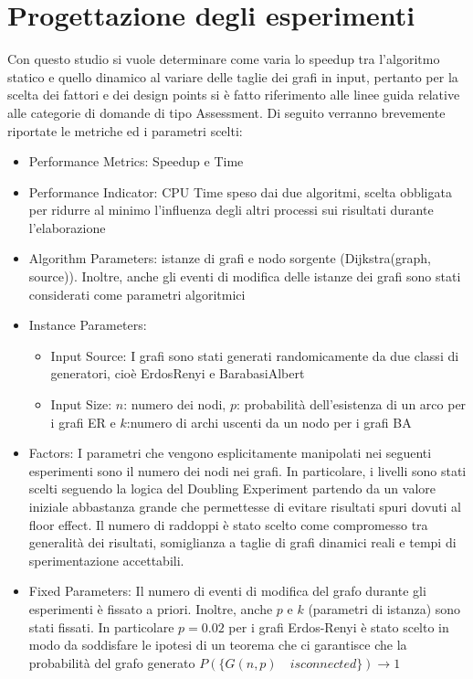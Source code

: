 \documentclass[a4paper]{article}
\begin{document}
\section{Progettazione degli esperimenti}
Con questo studio si vuole determinare come varia lo speedup tra l'algoritmo statico e quello dinamico al variare delle taglie dei grafi in input, pertanto per la scelta dei fattori e dei design points si è fatto riferimento alle linee guida relative alle categorie di domande di tipo Assessment.
Di seguito verranno brevemente riportate le metriche ed i parametri scelti:
\begin{itemize}
\item Performance Metrics: Speedup e Time
\item Performance Indicator: CPU Time speso dai due algoritmi, scelta obbligata per ridurre al minimo l'influenza degli altri processi sui risultati durante l'elaborazione
\item Algorithm Parameters: istanze di grafi e nodo sorgente (Dijkstra(graph, source)). Inoltre, anche gli eventi di modifica delle istanze dei grafi sono stati considerati come parametri algoritmici
\item Instance Parameters: 
\begin{itemize}
\item Input Source: I grafi sono stati generati randomicamente da due classi di generatori, cioè ErdosRenyi e BarabasiAlbert
\item Input Size: $n$: numero dei nodi, $p$: probabilità dell'esistenza di un arco per i grafi ER e $k$:numero di archi uscenti da un nodo per i grafi BA
\end{itemize}
\item Factors: I parametri che vengono esplicitamente manipolati nei seguenti esperimenti sono
il numero dei nodi nei grafi. In particolare, i livelli sono stati scelti seguendo la logica del Doubling Experiment partendo da un valore iniziale abbastanza grande che permettesse di evitare risultati spuri dovuti al floor effect. Il numero di raddoppi è stato scelto come compromesso tra generalità dei risultati, somiglianza a taglie di grafi dinamici reali e tempi di sperimentazione accettabili.
\item Fixed Parameters: Il numero di eventi di modifica del grafo durante gli esperimenti è fissato a priori. Inoltre, anche $p$ e $k$ (parametri di istanza) sono stati fissati. In particolare $p=0.02$ per i grafi Erdos-Renyi è stato scelto in modo da soddisfare le ipotesi di un teorema che ci garantisce che la probabilità del grafo generato $P(\{G(n,p) \quad is connected\})\rightarrow 1$

\end{itemize}
\end{document}

